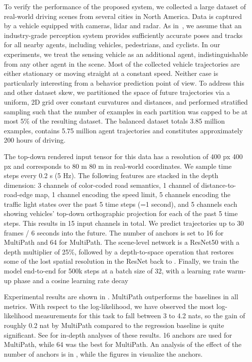 \documentclass{article}
\newcommand{\multiflow}{MultiPath\xspace}
\newcommand{\supsecref}[1]{\secref{#1}}
\begin{document}
To verify the performance of the proposed system, we collected a large dataset of real-world driving scenes from several cities in North America. Data is captured by a vehicle equipped with cameras, lidar and radar. As in~\cite{Casas18,Hong19}, we assume that an industry-grade perception system provides sufficiently accurate poses and tracks for all nearby agents, including vehicles, pedestrians, and cyclists. In our experiments, we treat the sensing vehicle as an additional agent, indistinguishable from any other agent in the scene.
Most of the collected vehicle trajectories are either stationary or moving straight at a constant speed. Neither case is particularly interesting from a behavior prediction point of view.  To address this and other dataset skew, we partitioned the space of future trajectories via a uniform, 2D grid over constant curvatures and distances, and performed stratified sampling such that the number of examples in each partition was capped to be at most 5\% of the resulting dataset. The balanced dataset totals 3.85 million examples, contains 5.75 million agent trajectories and constitutes approximately 200 hours of driving.

The top-down rendered input tensor for this data has a resolution of 400 px  400 px and corresponds to 80 m  80 m in real-world coordinates. We sample time steps every 0.2 s (5 Hz). The following features are stacked in the depth dimension: 3 channels of color-coded road semantics, 1 channel of distance-to-road-edge map, 1 channel encoding the speed limit, 5 channels encoding the traffic light states over the past 5 time steps (=1 second), and 5 channels each showing vehicles' top-down orthographic projection for each of the past 5 time steps. This results in 15 input channels in total. We predict trajectories up to 30 frames / 6 seconds into the future. The number of anchors  is set to 16 for \multiflow  and 64 for \multiflow . The scene-level network is a ResNet50 \cite{He16} with a depth multiplier of 25\%, followed by a depth-to-space operation that restores some of the lost spatial resolution in the ResNet back to . Finally, we train the model end-to-end for 500k steps at a batch size of 32, with a learning rate warm-up phase and a cosine learning rate decay 

Experimental results are shown in . \multiflow outperforms the baselines in all metrics. With respect to the log-likelihood, we have observed the most log-likelihood measurements for this task to fall between 3 to 4.2 nats, so the gain of roughly 0.2 nat by \multiflow compared to the regression baseline is quite significant. See \supsecref{sec:analysis} for in-depth analyses of these results. 16 anchors are used for \multiflow , while 64 was the best  for \multiflow . An analysis of the effect of the number of anchors  is in \supsecref{sec:anchors}, while the figures in \supsecref{sec:viz_clusters} visualize the anchors.
\end{document}

